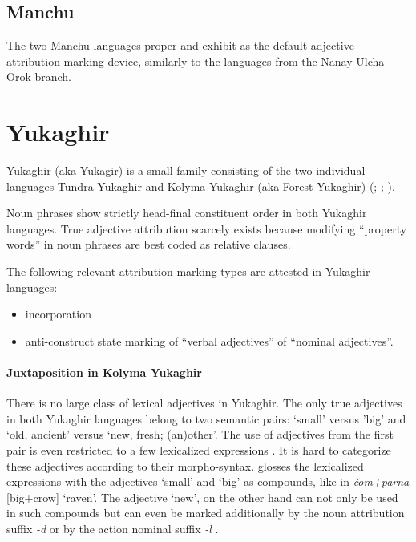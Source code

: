 \subsection{Manchu}
The two Manchu languages  proper and  exhibit  as the default adjective attribution marking device, similarly to the languages from the Nanay-Ulcha-Orok branch.

\section{Yukaghir}
\label{yukagir synchr}
Yukaghir (aka Yukagir) is a small family consisting of the two individual languages Tundra Yukaghir and Kolyma Yukaghir (aka Forest Yukaghir) (\citealt[223]{salminen2007}; \citealt[1–2]{maslova2003a}; \citealt[1]{maslova2003b}).

Noun phrases show strictly head-final constituent order in both Yukaghir languages. True adjective attribution scarcely exists because modifying “property words” in noun phrases are best coded as relative clauses.

The following relevant attribution marking types are attested in Yukaghir languages:
\begin{itemize}
\item incorporation
\item anti\hyp{}construct state marking
	\subitem of “verbal adjectives”
	\subitem of “nominal adjectives”.
\end{itemize}

\paragraph*{Juxtaposition in Kolyma Yukaghir}
There is no large class of lexical adjectives in Yukaghir. The only true adjectives in both Yukaghir languages belong to two semantic pairs: ‘small’ versus ’big’ and ‘old, ancient’ versus ‘new, fresh; (an)other’. The use of adjectives from the first pair is even restricted to a few lexicalized expressions \cite[70–71]{maslova2003b}. It is hard to categorize these adjectives according to their morpho-syntax. \citet[71]{maslova2003b} glosses the lexicalized expressions with the adjectives ‘small’ and ‘big’ as compounds, like in \textit{čom+parnā} [big+crow] ‘raven’. The adjective ‘new’, on the other hand can not only be used in such compounds but can even be marked additionally by the noun attribution suffix \textit{-d} or by the action nominal suffix \textit{-l} \citep[71]{maslova2003b}.

